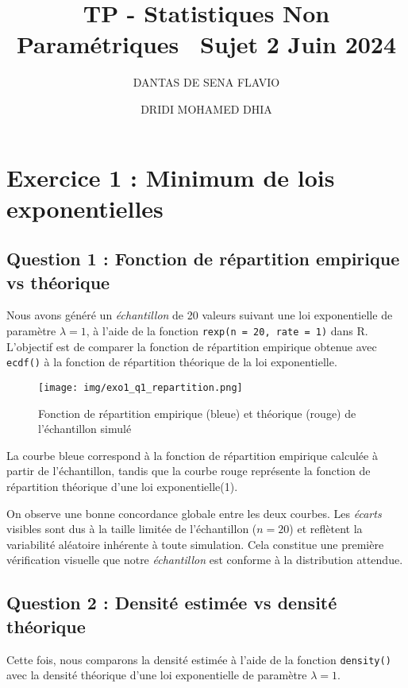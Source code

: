 \documentclass[a4paper,11pt]{article}
\title{TP - Statistiques Non Paramétriques \ \smallskip \large Sujet 2 \textendash{} Juin 2024}
\author{DANTAS DE SENA FLAVIO \and DRIDI MOHAMED DHIA}
\date{}
\begin{document}
\maketitle

\section*{Exercice 1 : Minimum de lois exponentielles}

\subsection*{Question 1 : Fonction de répartition empirique vs théorique}

Nous avons généré un \textit{échantillon} de 20 valeurs suivant une loi exponentielle de paramètre $\lambda = 1$, à l'aide de la fonction \texttt{rexp(n = 20, rate = 1)} dans R. L'objectif est de comparer la fonction de répartition empirique obtenue avec \texttt{ecdf()} à la fonction de répartition théorique de la loi exponentielle.

\begin{figure}[h!]
\centering
\texttt{[image: img/exo1\_q1\_repartition.png]}
\caption{Fonction de répartition empirique (bleue) et théorique (rouge) de l'échantillon simulé}
\end{figure}

\noindent
La courbe bleue correspond à la fonction de répartition empirique calculée à partir de l'échantillon, tandis que la courbe rouge représente la fonction de répartition théorique d'une loi exponentielle(1).

\medskip

On observe une bonne concordance globale entre les deux courbes. Les \textit{écarts} visibles sont dus à la taille limitée de l'échantillon ($n = 20$) et reflètent la variabilité aléatoire inhérente à toute simulation. Cela constitue une première vérification visuelle que notre \textit{échantillon} est conforme à la distribution attendue.

\subsection*{Question 2 : Densité estimée vs densité théorique}

Cette fois, nous comparons la densité estimée à l'aide de la fonction \texttt{density()} avec la densité théorique d'une loi exponentielle de paramètre $\lambda = 1$.
\end{document}
